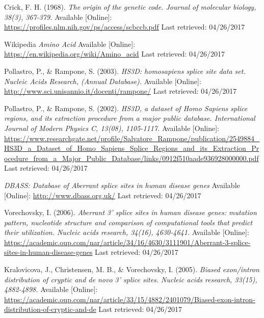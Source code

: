 \documentclass[12pt,a4paper]{article}
\begin{document}
	
    \thispagestyle{empty}
    \newpage
	 
	\begin{thebibliography}{9}
		
		Crick, F. H. (1968).
		\textit{The origin of the genetic code. Journal of molecular biology, 38(3), 367-379.}
		Available [Online]: \url{https://profiles.nlm.nih.gov/ps/access/scbccb.pdf}
		Last retrieved: 04/26/2017
		
		Wikipedia
		\textit{Amino Acid}
		Available [Online]: \url{https://en.wikipedia.org/wiki/Amino_acid}
		Last retrieved: 04/26/2017

		Pollastro, P., \& Rampone, S. (2003).
		\textit{ HS3D: homosapiens splice site data set. Nucleic Acids Research, (Annual Database).}
		Available [Online]: \url{ http://www.sci.unisannio.it/docenti/rampone/}
		Last retrieved: 04/26/2017

		Pollastro, P., \& Rampone, S. (2002).
		\textit{ HS3D, a dataset of Homo Sapiens splice regions, and its extraction procedure from a major public database. International Journal of Modern Physics C, 13(08), 1105-1117.}
		Available [Online]: \url{https://www.researchgate.net/profile/Salvatore_Rampone/publication/2549884_HS3D_a_Dataset_of_Homo_Sapiens_Splice_Regions_and_its_Extraction_Procedure_from_a_Major_Public_Database/links/0912f510aade936928000000.pdf}
		Last retrieved: 04/26/2017

		\textit{DBASS: Database of Aberrant splice sites in human disease genes}
		Available [Online]: \url{http://www.dbass.org.uk/}
		Last retrieved: 04/26/2017

		Vorechovsky, I. (2006).
		\textit{Aberrant 3' splice sites in human disease genes: mutation pattern, nucleotide structure and comparison of computational tools that predict their utilization. Nucleic acids research, 34(16), 4630-4641.}
		Available [Online]: \url{https://academic.oup.com/nar/article/34/16/4630/3111901/Aberrant-3-splice-sites-in-human-disease-genes}
		Last retrieved: 04/26/2017

		Kralovicova, J., Christensen, M. B., \& Vorechovsky, I. (2005).
		\textit{ Biased exon/intron distribution of cryptic and de novo 3' splice sites. Nucleic acids research, 33(15), 4882-4898.}
		Available [Online]: \url{https://academic.oup.com/nar/article/33/15/4882/2401079/Biased-exon-intron-distribution-of-cryptic-and-de}
		Last retrieved: 04/26/2017


\end{thebibliography}
\end{document}
